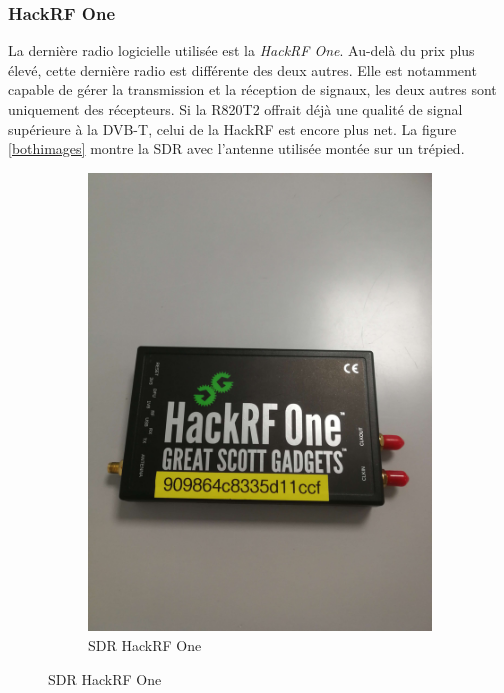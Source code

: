 \subsubsection{HackRF One}

La dernière radio logicielle utilisée est la \textit{HackRF One}. Au-delà du prix plus élevé, cette dernière radio est différente des deux autres. Elle est notamment capable de gérer la transmission et la réception de signaux, les deux autres sont uniquement des récepteurs. Si la R820T2 offrait déjà une qualité de signal supérieure à la \ac{DVB-T}, celui de la HackRF est encore plus net. La figure \ref{bothimages} montre la \ac{SDR} avec l'antenne utilisée montée sur un trépied.

\begin{figure}[h]
\centering
\begin{subfigure}{0.4\textwidth}
  \centering
  \includegraphics[width=\textwidth]{images/hackrf.png}
  \caption{SDR HackRF One}
  \label{term330}

\end{subfigure}
\end{figure}
